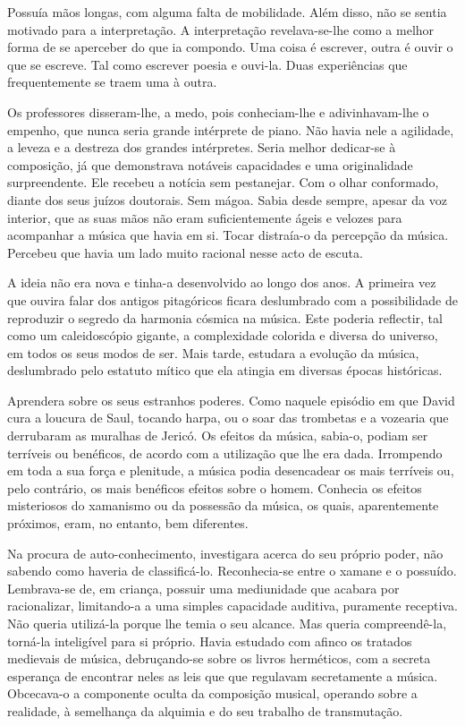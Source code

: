 Possuía mãos longas, com alguma falta de mobilidade. Além disso, não se
sentia motivado para a interpretação. A interpretação revelava-se-lhe
como a melhor forma de se aperceber do que ia compondo. Uma coisa é
escrever, outra é ouvir o que se escreve. Tal como escrever poesia e
ouvi-la. Duas experiências que frequentemente se traem uma à outra.

Os professores disseram-lhe, a medo, pois conheciam-lhe e
adivinhavam-lhe o empenho, que nunca seria grande intérprete de piano.
Não havia nele a agilidade, a leveza e a destreza dos grandes
intérpretes. Seria melhor dedicar-se à composição, já que demonstrava
notáveis capacidades e uma originalidade surpreendente. Ele recebeu a
notícia sem pestanejar. Com o olhar conformado, diante dos seus juízos
doutorais. Sem mágoa. Sabia desde sempre, apesar da voz interior, que as
suas mãos não eram suficientemente ágeis e velozes para acompanhar a
música que havia em si. Tocar distraía-o da percepção da música.
Percebeu que havia um lado muito racional nesse acto de escuta.

A ideia não era nova e tinha-a desenvolvido ao longo dos anos. A
primeira vez que ouvira falar dos antigos pitagóricos ficara deslumbrado
com a possibilidade de reproduzir o segredo da harmonia cósmica na
música. Este poderia reflectir, tal como um caleidoscópio gigante, a
complexidade colorida e diversa do universo, em todos os seus modos de
ser. Mais tarde, estudara a evolução da música, deslumbrado pelo
estatuto mítico que ela atingia em diversas épocas históricas.

Aprendera sobre os seus estranhos poderes. Como naquele episódio em que
David cura a loucura de Saul, tocando harpa, ou o soar das trombetas e a
vozearia que derrubaram as muralhas de Jericó. Os efeitos da música,
sabia-o, podiam ser terríveis ou benéficos, de acordo com a utilização
que lhe era dada. Irrompendo em toda a sua força e plenitude, a música
podia desencadear os mais terríveis ou, pelo contrário, os mais
benéficos efeitos sobre o homem. Conhecia os efeitos misteriosos do
xamanismo ou da possessão da música, os quais, aparentemente próximos,
eram, no entanto, bem diferentes.

Na procura de auto-conhecimento, investigara acerca do seu próprio
poder, não sabendo como haveria de classificá-lo. Reconhecia-se entre o
xamane e o possuído. Lembrava-se de, em criança, possuir uma mediunidade
que acabara por racionalizar, limitando-a a uma simples capacidade
auditiva, puramente receptiva. Não queria utilizá-la porque lhe temia o
seu alcance. Mas queria compreendê-la, torná-la inteligível para si
próprio. Havia estudado com afinco os tratados medievais de música,
debruçando-se sobre os livros herméticos, com a secreta esperança de
encontrar neles as leis que que regulavam secretamente a música.
Obcecava-o a componente oculta da composição musical, operando sobre a
realidade, à semelhança da alquimia e do seu trabalho de transmutação.

